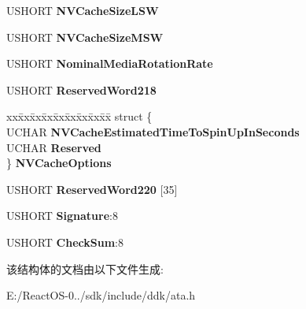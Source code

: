 \begin{DoxyCompactItemize}
\begin{tabbing}
\end{tabbing}\item 
\mbox{\label{struct___i_d_e_n_t_i_f_y___d_e_v_i_c_e___d_a_t_a_a74d771ad2cebdc84efae8178cde7f487}} 
U\+S\+H\+O\+RT {\bfseries N\+V\+Cache\+Size\+L\+SW}
\item 
\mbox{\label{struct___i_d_e_n_t_i_f_y___d_e_v_i_c_e___d_a_t_a_a99071fc0b6cb9d58beadab2eef54752f}} 
U\+S\+H\+O\+RT {\bfseries N\+V\+Cache\+Size\+M\+SW}
\item 
\mbox{\label{struct___i_d_e_n_t_i_f_y___d_e_v_i_c_e___d_a_t_a_a6d221e1a5a24f6555ca9ab0d1284cdd4}} 
U\+S\+H\+O\+RT {\bfseries Nominal\+Media\+Rotation\+Rate}
\item 
\mbox{\label{struct___i_d_e_n_t_i_f_y___d_e_v_i_c_e___d_a_t_a_a515161bb5a325ce87c3766c1d4282d33}} 
U\+S\+H\+O\+RT {\bfseries Reserved\+Word218}
\item 
\mbox{\label{struct___i_d_e_n_t_i_f_y___d_e_v_i_c_e___d_a_t_a_a1a891c593b2a8a0ddc66c36dd387f71e}} 
\begin{tabbing}
xx\=xx\=xx\=xx\=xx\=xx\=xx\=xx\=xx\=\kill
struct \{\\
\>UCHAR {\bfseries NVCacheEstimatedTimeToSpinUpInSeconds}\\
\>UCHAR {\bfseries Reserved}\\
\} {\bfseries NVCacheOptions}\\

\end{tabbing}\item 
\mbox{\label{struct___i_d_e_n_t_i_f_y___d_e_v_i_c_e___d_a_t_a_ac1907b2bddf0cf767c28fce0222c2e56}} 
U\+S\+H\+O\+RT {\bfseries Reserved\+Word220} \mbox{[}35\mbox{]}
\item 
\mbox{\label{struct___i_d_e_n_t_i_f_y___d_e_v_i_c_e___d_a_t_a_aa2129f3ccc81924f7205df986c2d0054}} 
U\+S\+H\+O\+RT {\bfseries Signature}\+:8
\item 
\mbox{\label{struct___i_d_e_n_t_i_f_y___d_e_v_i_c_e___d_a_t_a_a498e7a01cbb64a76fbc59f4521074411}} 
U\+S\+H\+O\+RT {\bfseries Check\+Sum}\+:8
\end{DoxyCompactItemize}


该结构体的文档由以下文件生成\+:\begin{DoxyCompactItemize}
\item 
E\+:/\+React\+O\+S-\/0../sdk/include/ddk/ata.\+h\end{DoxyCompactItemize}
